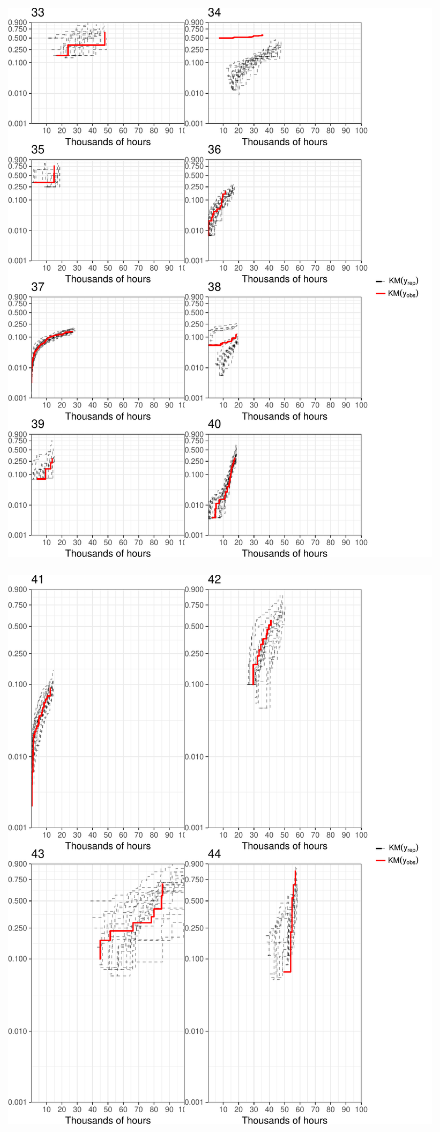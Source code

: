 \documentclass[12pt]{article}
\begin{document}
\begin{figure}[H]
\includegraphics[width=\textwidth]{ppcheck-5.pdf}
\end{figure}
\begin{figure}[H]
\includegraphics[width=\textwidth]{ppcheck-6.pdf}
\end{figure}
\clearpage
%

% 

\end{document}

